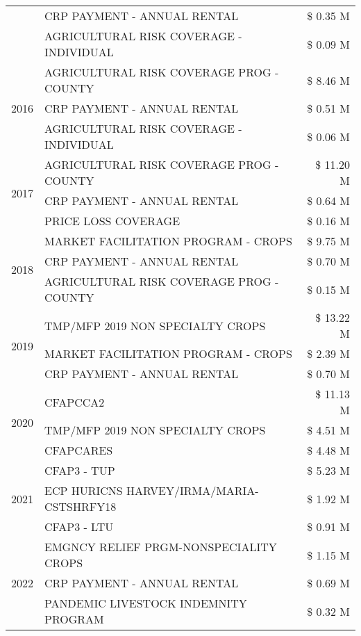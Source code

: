 \begin{tabular}{llr}
 & CRP PAYMENT - ANNUAL RENTAL & \$ 0.35 M \\
 & AGRICULTURAL RISK COVERAGE - INDIVIDUAL & \$ 0.09 M \\
\cline{1-3}
\multirow[t]{3}{*}{2016} & AGRICULTURAL RISK COVERAGE PROG - COUNTY & \$ 8.46 M \\
 & CRP PAYMENT - ANNUAL RENTAL & \$ 0.51 M \\
 & AGRICULTURAL RISK COVERAGE - INDIVIDUAL & \$ 0.06 M \\
\cline{1-3}
\multirow[t]{3}{*}{2017} & AGRICULTURAL RISK COVERAGE PROG - COUNTY & \$ 11.20 M \\
 & CRP PAYMENT - ANNUAL RENTAL & \$ 0.64 M \\
 & PRICE LOSS COVERAGE & \$ 0.16 M \\
\cline{1-3}
\multirow[t]{3}{*}{2018} & MARKET FACILITATION PROGRAM - CROPS & \$ 9.75 M \\
 & CRP PAYMENT - ANNUAL RENTAL & \$ 0.70 M \\
 & AGRICULTURAL RISK COVERAGE PROG - COUNTY & \$ 0.15 M \\
\cline{1-3}
\multirow[t]{3}{*}{2019} & TMP/MFP 2019 NON SPECIALTY CROPS & \$ 13.22 M \\
 & MARKET FACILITATION PROGRAM - CROPS & \$ 2.39 M \\
 & CRP PAYMENT - ANNUAL RENTAL & \$ 0.70 M \\
\cline{1-3}
\multirow[t]{3}{*}{2020} & CFAPCCA2 & \$ 11.13 M \\
 & TMP/MFP 2019 NON SPECIALTY CROPS & \$ 4.51 M \\
 & CFAPCARES & \$ 4.48 M \\
\cline{1-3}
\multirow[t]{3}{*}{2021} & CFAP3 - TUP & \$ 5.23 M \\
 & ECP HURICNS HARVEY/IRMA/MARIA-CSTSHRFY18 & \$ 1.92 M \\
 & CFAP3 - LTU & \$ 0.91 M \\
\cline{1-3}
\multirow[t]{3}{*}{2022} & EMGNCY RELIEF PRGM-NONSPECIALITY CROPS & \$ 1.15 M \\
 & CRP PAYMENT - ANNUAL RENTAL & \$ 0.69 M \\
 & PANDEMIC LIVESTOCK INDEMNITY PROGRAM & \$ 0.32 M \\
\cline{1-3}
\bottomrule
\end{tabular}
